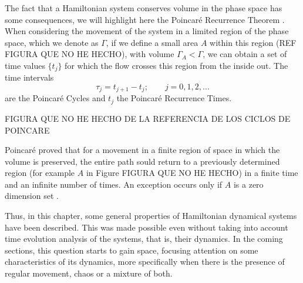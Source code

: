 The fact that a Hamiltonian system conserves volume in the phase space has some consequences, we will highlight here the Poincaré Recurrence Theorem \cite{zaslavsky2005hamiltonian} \cite{zaslavsky2007physics}. When considering the movement of the system in a limited region of the phase space, which we denote as $\Gamma$, if we define a small area $A$ within this region (REF FIGURA QUE NO HE HECHO), with volume $\Gamma_A < \Gamma$, we can obtain a set of time values $\{ t_j\}$ for which the flow crosses this region from the inside out. The time intervals
\begin{equation}
\tau_j=t_{j+1}-t_j;\qquad j=0,1,2,...
\end{equation}
are the Poincaré Cycles and $t_j$ the Poincaré Recurrence Times. \par



FIGURA QUE NO HE HECHO DE LA REFERENCIA DE LOS CICLOS DE POINCARE\par

Poincaré proved that for a movement in a finite region of space in which the volume is preserved, the entire path sould return to a previously determined region (for example $A$ in Figure FIGURA QUE NO HE HECHO) in a finite time and an infinite number of times. An exception occurs only if $A$ is a zero dimension set \cite{zaslavsky2005hamiltonian} \cite{zaslavsky2007physics} \cite{xavier2015banhos}.\par 

Thus, in this chapter, some general properties of Hamiltonian dynamical systems have been described. This was made possible even without taking into account time evolution analysis of the systems, that is, their dynamics. In the coming sections, this question starts to gain space, focusing attention on some characteristics of its dynamics, more specifically when there is the presence of regular movement, chaos or a mixture of both.



